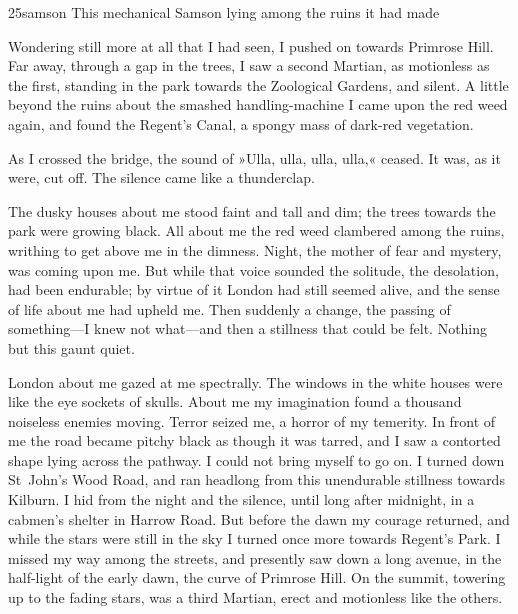 \begin{a4}
	\begin{bwbigpic}
		[1.1] 
		{25samson} 
		{This mechanical Samson lying among the ruins it had made} 
	\end{bwbigpic}
\end{a4}

Wondering still more at all that I had seen, I pushed on towards Primrose Hill. Far away, through a gap in the trees, I saw a second Martian, as motionless as the first, standing in the park towards the Zoological Gardens, and silent. A little beyond the ruins about the smashed handling-machine I came upon the red weed again, and found the Regent's Canal, a spongy mass of dark-red vegetation.

As I crossed the bridge, the sound of »Ulla, ulla, ulla, ulla,« ceased. It was, as it were, cut off. The silence came like a thunderclap.

The dusky houses about me stood faint and tall and dim; the trees towards the park were growing black. All about me the red weed clambered among the ruins, writhing to get above me in the dimness. Night, the mother of fear and mystery, was coming upon me. But while that voice sounded the solitude, the desolation, had been endurable; by virtue of it London had still seemed alive, and the sense of life about me had upheld me. Then suddenly a change, the passing of something—I knew not what—and then a stillness that could be felt. Nothing but this gaunt quiet.

London about me gazed at me spectrally. The windows in the white houses were like the eye sockets of skulls. About me my imagination found a thousand noiseless enemies moving. Terror seized me, a horror of my temerity. In front of me the road became pitchy black as though it was tarred, and I saw a contorted shape lying across the pathway. I could not bring myself to go on. I turned down St~John's Wood Road, and ran headlong from this unendurable stillness towards Kilburn. I hid from the night and the silence, until long after midnight, in a cabmen's shelter in Harrow Road. But before the dawn my courage returned, and while the stars were still in the sky I turned once more towards Regent's Park. I missed my way among the streets, and presently saw down a long avenue, in the half-light of the early dawn, the curve of Primrose Hill. On the summit, towering up to the fading stars, was a third Martian, erect and motionless like the others.


